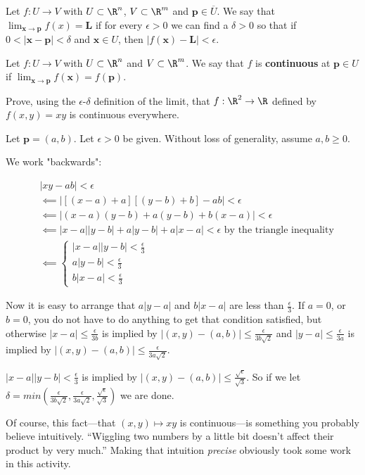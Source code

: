 \documentclass{ximera}
\begin{document}
\begin{definition}
	Let $f:U \to  V$  with $U \subset \R^n$, $V \subset \R^m$ and $\mathbf{p} \in \overline{U}$.  We say that $\lim_{\mathbf{x} \to \mathbf{p}}f(x) = \mathbf{L}$ if for every $\epsilon >0$ we can find a 
	$\delta>0$ so that if $0<|\mathbf{x}-\mathbf{p}|<\delta$ and $\mathbf{x} \in U$, then $|f(\mathbf{x})-\mathbf{L}|<\epsilon$.
\end{definition}

\begin{definition}
	 Let $f:U \to  V$  with $U \subset \R^n$ and $V \subset \R^m$.  We say that $f$ is \textbf{continuous} at $\mathbf{p} \in U$ if $\lim_{\mathbf{x} \to \mathbf{p}} f(\mathbf{x}) = f(\mathbf{p})$. 
\end{definition}

Prove, using the $\epsilon$-$\delta$ definition of the limit, that $f:\R^2 \to \R$ defined by $f(x,y) = xy$ is continuous everywhere.

\begin{free-response}
	Let $\mathbf{p} = (a,b)$.   Let $\epsilon>0$ be given.  Without loss of generality, assume $a,b \geq 0$.
	
	We work "backwards":
	
	\begin{align*}
		&|xy-ab|<\epsilon\\
		&\impliedby |[(x-a)+a][(y-b)+b]-ab| <\epsilon \\
		&\impliedby |(x-a)(y-b)+a(y-b) +b(x-a)| <\epsilon \\
		&\impliedby |x-a||y-b|+a|y-b|+a|x-a|< \epsilon \text{ by the triangle inequality}\\
		&\impliedby \begin{cases}
			|x-a||y-b| < \frac{\epsilon}{3}\\
			a|y-b| < \frac{\epsilon}{3}\\
			b|x-a| < \frac{\epsilon}{3}
			\end{cases}
	\end{align*}
	
	Now it is easy to arrange that $a|y-a|$  and $b|x-a|$ are less than $\frac{\epsilon}{3}$.  If $a=0$, or $b=0$, 
	you do not have to do anything to get that condition satisfied, but otherwise $|x-a| \leq \frac{\epsilon}{3b}$ is implied by $|(x,y) - (a,b)| \leq \frac{\epsilon}{3b\sqrt{2}}$
	and  $|y-a| \leq \frac{\epsilon}{3a}$ is implied by $|(x,y) - (a,b)| \leq \frac{\epsilon}{3a\sqrt{2}}$.
	
	$|x-a||y-b| < \frac{\epsilon}{3}$ is implied by $|(x,y)-(a,b)| \leq \frac{\sqrt{\epsilon}}{\sqrt{3}}$.  
	So if we let $\delta = min(\frac{\epsilon}{3b\sqrt{2}}, \frac{\epsilon}{3a\sqrt{2}}, \frac{\sqrt{\epsilon}}{\sqrt{3}})$ 
	we are done.
\end{free-response}

Of course, this fact---that $(x,y) \mapsto xy$ is continuous---is something you probably believe intuitively.  ``Wiggling two numbers by a little bit doesn't affect their product by very much.''  Making that intuition \textit{precise} obviously took some work in this activity.
\end{document}
